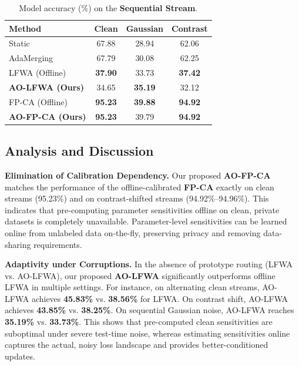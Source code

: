 \documentclass{article}
\theoremstyle{plain}
\theoremstyle{definition}
\begin{document}
\begin{table}[t]
\caption{Model accuracy (\%) on the \textbf{Sequential Stream}.}
\label{tab:sequential}
\vskip 0.08in
\centering
\begin{small}
\begin{sc}
\begin{tabular}{lccc}
\toprule
Method & Clean & Gaussian & Contrast \\
\midrule
Static     & 67.88 & 28.94 & 62.06 \\
AdaMerging & 67.79 & 30.08 & 62.25 \\
\midrule
LFWA (Offline)  & \textbf{37.90} & 33.73 & \textbf{37.42} \\
\textbf{AO-LFWA (Ours)} & 34.65 & \textbf{35.19} & 32.12 \\
\midrule
FP-CA (Offline)  & \textbf{95.23} & \textbf{39.88} & \textbf{94.92} \\
\textbf{AO-FP-CA (Ours)} & \textbf{95.23} & 39.79 & \textbf{94.92} \\
\bottomrule
\end{tabular}
\end{sc}
\end{small}
\vskip -0.1in
\end{table}

\subsection{Analysis and Discussion}

\textbf{Elimination of Calibration Dependency.} 
Our proposed \textbf{AO-FP-CA} matches the performance of the offline-calibrated \textbf{FP-CA} exactly on clean streams (95.23\%) and on contrast-shifted streams (94.92\%--94.96\%). This indicates that pre-computing parameter sensitivities offline on clean, private datasets is completely unavailable. Parameter-level sensitivities can be learned online from unlabeled data on-the-fly, preserving privacy and removing data-sharing requirements.

\textbf{Adaptivity under Corruptions.}
In the absence of prototype routing (LFWA vs. AO-LFWA), our proposed \textbf{AO-LFWA} significantly outperforms offline LFWA in multiple settings. For instance, on alternating clean streams, AO-LFWA achieves \textbf{45.83\%} vs. \textbf{38.56\%} for LFWA. On contrast shift, AO-LFWA achieves \textbf{43.85\%} vs. \textbf{38.25\%}. On sequential Gaussian noise, AO-LFWA reaches \textbf{35.19\%} vs. \textbf{33.73\%}. This shows that pre-computed clean sensitivities are suboptimal under severe test-time noise, whereas estimating sensitivities online captures the actual, noisy loss landscape and provides better-conditioned updates.
\end{document}
